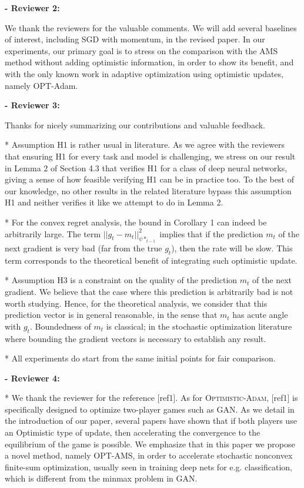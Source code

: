 \documentclass{article}
\begin{document}
\textbf{- Reviewer 2:}

We thank the reviewers for the valuable comments.
We will add several baselines of interest, including SGD with momentum, in the revised paper.
In our experiments, our primary goal is to stress on the comparison with the AMS method without adding optimistic information, in order to show its benefit, and with the only known work in adaptive optimization using optimistic updates, namely OPT-Adam.


\textbf{- Reviewer 3:}

Thanks for nicely summarizing our contributions and valuable feedback.

* Assumption H1 is rather usual in literature.
As we agree with the reviewers that ensuring H1 for every task and model is challenging, we stress on our result in Lemma 2 of Section 4.3 that verifies H1 for a class of deep neural networks, giving a sense of how feasible verifying H1 can be in practice too.
To the best of our knowledge, no other results in the related literature bypass this assumption H1 and neither verifies it like we attempt to do in Lemma 2.

* For the convex regret analysis, the bound in Corollary 1 can indeed be arbitrarily large. The term $||g_t  - m_t ||_{\psi*_{t-1}}^2$ implies that if the prediction $m_t$ of the next gradient is very bad (far from the true $g_t$), then the rate will be slow. This term corresponds to the theoretical benefit of integrating such optimistic update.

* Assumption H3 is a constraint on the quality of the prediction $m_t$ of the next gradient. 
We believe that the case where this prediction is arbitrarily bad is not worth studying. 
Hence, for the theoretical analysis, we consider that this prediction vector is in general reasonable, in the sense that $m_t$ has acute angle with $g_t$. 
Boundedness of $m_t$ is classical; in the stochastic optimization literature where bounding the gradient vectors is necessary to establish any result.

* All experiments do start from the same initial points for fair comparison. 

\textbf{- Reviewer 4:}

* We thank the reviewer for the reference [ref1].
As for \textsc{Optimistic-Adam}, [ref1] is specifically designed to optimize two-player games such as GAN. 
As we detail in the introduction of our paper, several papers have shown that if both players use an Optimistic type of update, then accelerating the convergence to the equilibrium of the game is possible.
We emphasize that in this paper we propose a novel method, namely OPT-AMS, in order to accelerate stochastic nonconvex finite-sum optimization, usually seen in training deep nets for e.g. classification, which is different from the minmax problem in GAN.
\end{document}
